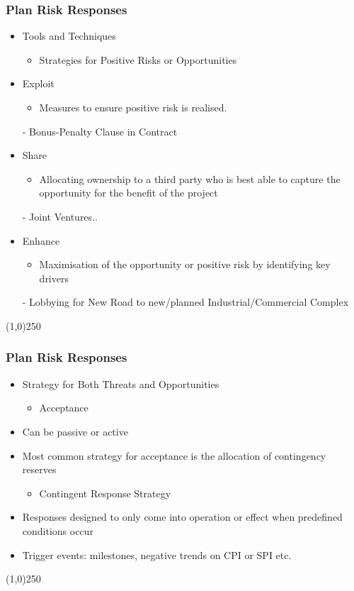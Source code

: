 \begin{frame}
\frametitle{Plan Risk Responses}
\begin{itemize}
\item Tools and Techniques
\begin{itemize}
	\item Strategies for Positive Risks or Opportunities
\end{itemize}
\item Exploit
\begin{itemize}
	\item Measures to ensure positive risk is realised.
\end{itemize}
- Bonus-Penalty Clause in Contract
\item Share
\begin{itemize}
	\item Allocating ownership to a third party who is best able to capture the opportunity for the benefit of the project
\end{itemize}
- Joint Ventures..
\item Enhance
\begin{itemize}
	\item Maximisation of the opportunity or positive risk by identifying key drivers
\end{itemize}
- Lobbying for New Road to new/planned Industrial/Commercial Complex
\end{itemize}
\end{frame}\begin{center}\line(1,0){250}\end{center}




\begin{frame}
\frametitle{Plan Risk Responses}
\begin{itemize}
\item Strategy for Both Threats and Opportunities
\begin{itemize}
	\item Acceptance
\end{itemize}
\item Can be passive or active
\item Most common strategy for acceptance is the allocation of contingency reserves
\begin{itemize}
	\item Contingent Response Strategy
\end{itemize}
\item Responses designed to only come into operation or effect when predefined conditions occur
\item Trigger events: milestones, negative trends on CPI or SPI etc.
\end{itemize}
\end{frame}\begin{center}\line(1,0){250}\end{center}






